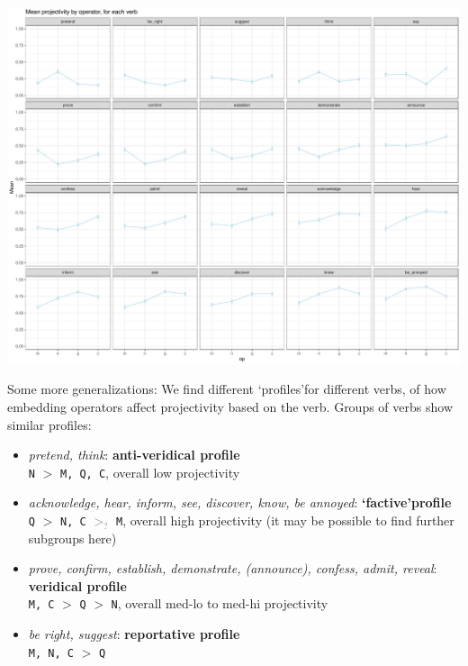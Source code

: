 \documentclass[10pt]{article}\usepackage[]{graphicx}\usepackage[]{color}
\newenvironment{knitrout}{}{} %
\begin{document}
\begin{knitrout}
\color{fgcolor}

{\centering \includegraphics[width=\linewidth]{figures/figuresverb-profiles-1} 

}


\end{knitrout}
Some more generalizations: We find different \lq profiles\rq for different verbs, of how embedding operators affect projectivity based on the verb. Groups of verbs show similar profiles:

\begin{itemize}
  \item \emph{pretend, think}: \textbf{anti-veridical profile}\\
    \texttt{N} $>$ \texttt{M, Q, C}, overall low projectivity

  \item \emph{acknowledge, hear, inform, see, discover, know, be annoyed}: \textbf{\lq factive\rq profile}\\
    \texttt{Q} $>$ \texttt{N, C} \textcolor{gray}{$>_?$} \texttt{M}, overall high projectivity (it may be possible to find further subgroups here)

  \item \emph{prove, confirm, establish, demonstrate, (announce), confess, admit, reveal}: \textbf{veridical profile}\\
    \texttt{M, C} $>$ \texttt{Q} $>$ \texttt{N}, overall med-lo to med-hi projectivity
  
  \item \emph{be right, suggest}: \textbf{reportative profile}\\
    \texttt{M, N, C} $>$ \texttt{Q}

\end{itemize}
\end{document}
